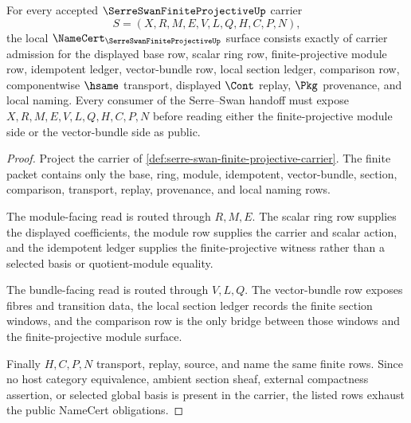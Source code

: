 \begin{theorem}
\label{thm:serre-swan-finite-projective-namecert-obligations}
For every accepted $\SerreSwanFiniteProjectiveUp$ carrier
$$
S=(X,R,M,E,V,L,Q,H,C,P,N),
$$
the local $\NameCert_{\SerreSwanFiniteProjectiveUp}$ surface consists exactly of carrier admission for the displayed base row, scalar ring row, finite-projective module row, idempotent ledger, vector-bundle row, local section ledger, comparison row, componentwise $\hsame$ transport, displayed $\Cont$ replay, $\Pkg$ provenance, and local naming. Every consumer of the Serre--Swan handoff must expose $X,R,M,E,V,L,Q,H,C,P,N$ before reading either the finite-projective module side or the vector-bundle side as public.
\end{theorem}
\begin{proof}
Project the carrier of \autoref{def:serre-swan-finite-projective-carrier}. The finite packet contains only the base, ring, module, idempotent, vector-bundle, section, comparison, transport, replay, provenance, and local naming rows.

The module-facing read is routed through $R,M,E$. The scalar ring row supplies the displayed coefficients, the module row supplies the carrier and scalar action, and the idempotent ledger supplies the finite-projective witness rather than a selected basis or quotient-module equality.

The bundle-facing read is routed through $V,L,Q$. The vector-bundle row exposes fibres and transition data, the local section ledger records the finite section windows, and the comparison row is the only bridge between those windows and the finite-projective module surface.

Finally $H,C,P,N$ transport, replay, source, and name the same finite rows. Since no host category equivalence, ambient section sheaf, external compactness assertion, or selected global basis is present in the carrier, the listed rows exhaust the public NameCert obligations.
\end{proof}


